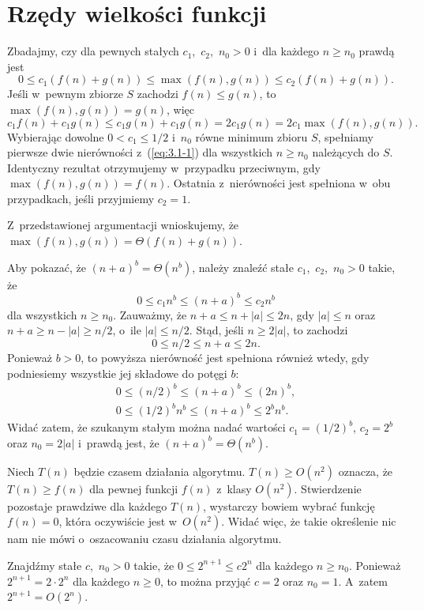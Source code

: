 \chapter{Rzędy wielkości funkcji}


\exercise %
Zbadajmy, czy dla pewnych stałych $c_1$,~$c_2$,~$n_0>0$ i~dla każdego $n\ge n_0$ prawdą jest
\begin{equation}
	0 \le c_1(f(n)+g(n)) \le \max(f(n),g(n)) \le c_2(f(n)+g(n)). \label{eq:3.1-1}
\end{equation}
Jeśli w~pewnym zbiorze $S$ zachodzi $f(n)\le g(n)$, to $\max(f(n),g(n))=g(n)$, więc
\[
	c_1f(n)+c_1g(n) \le c_1g(n)+c_1g(n) = 2c_1g(n) = 2c_1\max(f(n), g(n)).
\]
Wybierając dowolne $0<c_1\le1/2$ i~$n_0$ równe minimum zbioru $S$, spełniamy pierwsze dwie nierówności z~(\ref{eq:3.1-1}) dla wszystkich $n\ge n_0$ należących do $S$. Identyczny rezultat otrzymujemy w~przypadku przeciwnym, gdy $\max(f(n),g(n))=f(n)$. Ostatnia z~nierówności jest spełniona w~obu przypadkach, jeśli przyjmiemy $c_2=1$.

Z~przedstawionej argumentacji wnioskujemy, że $\max(f(n),g(n))=\Theta(f(n)+g(n))$.

\exercise %
Aby pokazać, że $(n+a)^b=\Theta(n^b)$, należy znaleźć stałe $c_1$,~$c_2$,~$n_0>0$ takie, że
\[
	0 \le c_1n^b \le (n+a)^b \le c_2n^b
\]
dla wszystkich $n\ge n_0$. Zauważmy, że $n+a\le n+|a|\le2n$, gdy $|a|\le n$ oraz $n+a\ge n-|a|\ge n/2$, o~ile $|a|\le n/2$. Stąd, jeśli $n\ge 2|a|$, to zachodzi
\[
	0 \le n/2 \le n+a \le 2n.
\]
Ponieważ $b>0$, to powyższa nierówność jest spełniona również wtedy, gdy podniesiemy wszystkie jej składowe do potęgi $b$:
\begin{gather*}
	0 \le (n/2)^b \le (n+a)^b \le (2n)^b, \\
	0 \le (1/2)^bn^b \le (n+a)^b \le 2^bn^b.
\end{gather*}
Widać zatem, że szukanym stałym można nadać wartości $c_1=(1/2)^b$, $c_2=2^b$ oraz $n_0=2|a|$ i~prawdą jest, że $(n+a)^b=\Theta(n^b)$.

\exercise %
Niech $T(n)$ będzie czasem działania algorytmu. $T(n)\ge O(n^2)$ oznacza, że $T(n)\ge f(n)$ dla pewnej funkcji $f(n)$ z~klasy $O(n^2)$. Stwierdzenie pozostaje prawdziwe dla każdego $T(n)$, wystarczy bowiem wybrać funkcję $f(n)=0$, która oczywiście jest w~$O(n^2)$. Widać więc, że takie określenie nic nam nie mówi o~oszacowaniu czasu działania algorytmu.

\exercise %
Znajdźmy stałe $c$,~$n_0>0$ takie, że $0\le2^{n+1}\le c2^n$ dla każdego $n\ge n_0$. Ponieważ $2^{n+1}=2\cdot2^n$ dla każdego $n\ge0$, to można przyjąć $c=2$ oraz $n_0=1$. A~zatem $2^{n+1}=O(2^n)$.

